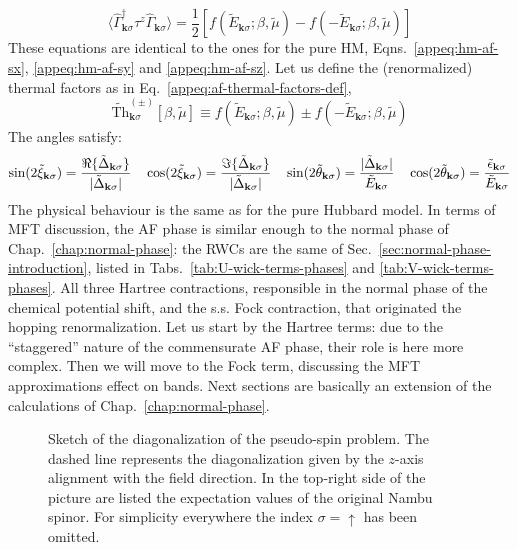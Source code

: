 \begin{equation}\label{eq:af-rot-z-expectation}
	\langle \hat \Gamma_{\mathbf{k}\sigma}^\dagger \tau^z \hat \Gamma_{\mathbf{k}\sigma} \rangle = \frac{1}{2} \left[
		f\left(
			\tilde{E}_{\mathbf{k}\sigma};\beta,\tilde{\mu}
		\right) - f\left(
			-\tilde{E}_{\mathbf{k}\sigma};\beta,\tilde{\mu}
		\right)
	\right]
\end{equation}
These equations are identical to the ones for the pure HM, Eqns.~\eqref{appeq:hm-af-sx}, \eqref{appeq:hm-af-sy} and \eqref{appeq:hm-af-sz}. Let us define the (renormalized) thermal factors as in Eq.~\eqref{appeq:af-thermal-factors-def},
\begin{equation}\label{eq:af-ren-thermal-factors-def}
	\tilde{\mathrm{Th}}_{\mathbf{k}\sigma}^{(\pm)}[\beta,\tilde{\mu}] \equiv 
	f\left(
		\tilde{E}_{\mathbf{k}\sigma};\beta,\tilde{\mu}
		\right) \pm f\left(
		-\tilde{E}_{\mathbf{k}\sigma};\beta,\tilde{\mu}
	\right)
\end{equation}
The angles satisfy: \begin{equation}\label{eq:af-bogoliubov-angle-relations}
	\sin \normalfont(2\tilde{\xi}_{\mathbf{k}\sigma}) = \frac{\Re\{\tilde{\Delta}_{\mathbf{k}\sigma}\}}{|\tilde{\Delta}_{\mathbf{k}\sigma}|}
	\quad
	\cos \normalfont(2\tilde{\xi}_{\mathbf{k}\sigma}) = \frac{\Im\{\tilde{\Delta}_{\mathbf{k}\sigma}\}}{|\tilde{\Delta}_{\mathbf{k}\sigma}|}
	\quad
	\sin \normalfont(2\tilde{\theta}_{\mathbf{k}\sigma}) = \frac{|\tilde{\Delta}_{\mathbf{k}\sigma}|}{\tilde{E}_{\mathbf{k}\sigma}}
	\quad
	\cos \normalfont(2\tilde{\theta}_{\mathbf{k}\sigma}) = \frac{\tilde{\epsilon}_{\mathbf{k}\sigma}}{\tilde{E}_{\mathbf{k}\sigma}}
\end{equation}
The physical behaviour is the same as for the pure Hubbard model. In terms of MFT discussion, the AF phase is similar enough to the normal phase of Chap.~\ref{chap:normal-phase}: the RWCs are the same of Sec.~\ref{sec:normal-phase-introduction}, listed in Tabs.~\ref{tab:U-wick-terms-phases} and \ref{tab:V-wick-terms-phases}. All three Hartree contractions, responsible in the normal phase of the chemical potential shift, and the s.s. Fock contraction, that originated the hopping renormalization. Let us start by the Hartree terms: due to the ``staggered'' nature of the commensurate AF phase, their role is here more complex. Then we will move to the Fock term, discussing the MFT approximations effect on bands. Next sections are basically an extension of the calculations of Chap.~\ref{chap:normal-phase}.

\begin{figure}
	\centering
	
	\caption{Sketch of the diagonalization of the pseudo-spin problem. The dashed line represents the diagonalization given by the $z$-axis alignment with the field direction. In the top-right side of the picture are listed the expectation values of the original Nambu spinor. For simplicity everywhere the index $\sigma=\uparrow$ has been omitted.}
	\label{fig:pseudo-magnetic-field}
\end{figure}


